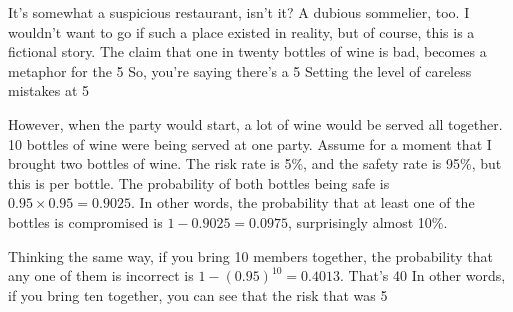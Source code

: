 \documentclass{ltjsbook}
\begin{document}
It's somewhat a suspicious restaurant, isn't it? A dubious sommelier, too. I wouldn't want to go if such a place existed in reality, but of course, this is a fictional story. The claim that one in twenty bottles of wine is bad, becomes a metaphor for the 5%
So, you're saying there's a 5%
Setting the level of careless mistakes at 5%

However, when the party would start, a lot of wine would be served all together. 10 bottles of wine were being served at one party.
Assume for a moment that I brought two bottles of wine. The risk rate is 5\%, and the safety rate is 95\%, but this is per bottle. The probability of both bottles being safe is $0.95 \times 0.95 = 0.9025$. In other words, the probability that at least one of the bottles is compromised is $1-0.9025=0.0975$, surprisingly almost 10\%.

Thinking the same way, if you bring 10 members together, the probability that any one of them is incorrect is $1-(0.95)^{10}=0.4013$. That's 40%
In other words, if you bring ten together, you can see that the risk that was 5%
\end{document}
